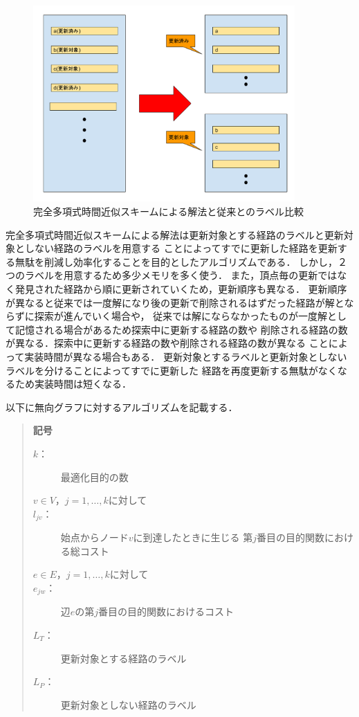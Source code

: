 \documentclass[12pt]{optlab-bachelor}
\begin{document}
\begin{figure}[htbp]
  \centering
  \caption{完全多項式時間近似スキームによる解法と従来とのラベル比較}
  \includegraphics[width=10.0cm]{fig/fig1.pdf}
\end{figure}

完全多項式時間近似スキームによる解法は更新対象とする経路のラベルと更新対象としない経路のラベルを用意する
ことによってすでに更新した経路を更新する無駄を削減し効率化することを目的としたアルゴリズムである．
しかし，２つのラベルを用意するため多少メモリを多く使う．
また，頂点毎の更新ではなく発見された経路から順に更新されていくため，更新順序も異なる．
更新順序が異なると従来では一度解になり後の更新で削除されるはずだった経路が解とならずに探索が進んでいく場合や，
従来では解にならなかったものが一度解として記憶される場合があるため探索中に更新する経路の数や
削除される経路の数が異なる．探索中に更新する経路の数や削除される経路の数が異なる
ことによって実装時間が異なる場合もある．
更新対象とするラベルと更新対象としないラベルを分けることによってすでに更新した
経路を再度更新する無駄がなくなるため実装時間は短くなる．


以下に無向グラフに対するアルゴリズムを記載する．

\begin{quote}
  \textbf{記号}
  \begin{description}
    \item[$k$：] 最適化目的の数
    \item[$v \in V$，$j = 1 , \ldots , k$に対して]
    \item[$l_{jv}$：] 始点からノード$v$に到達したときに生じる
    第$j$番目の目的関数における総コスト
    \item[$e \in E$，$j = 1 , \ldots , k$に対して]
    \item[$e_{jw}$：] 辺$e$の第$j$番目の目的関数におけるコスト
    \item[$L_T$：] 更新対象とする経路のラベル
    \item[$L_P$：] 更新対象としない経路のラベル
  \end{description}
\end{quote}
\end{document}
